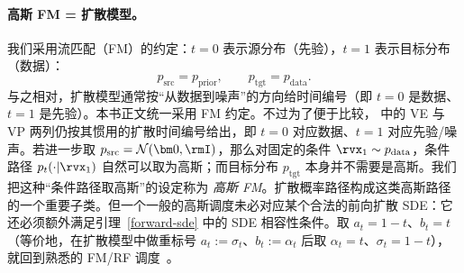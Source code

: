 \paragraph{高斯 FM = 扩散模型。}
我们采用流匹配（FM）的约定：$t=0$ 表示源分布（先验），$t=1$ 表示目标分布（数据）：
\[
p_{\mathrm{src}}=p_{\mathrm{prior}},\qquad p_{\mathrm{tgt}}=p_{\mathrm{data}}.
\]
与之相对，扩散模型通常按“从数据到噪声”的方向给时间编号（即 $t=0$ 是数据、$t=1$ 是先验）。本书正文统一采用 FM 约定。不过为了便于比较， 中的 VE 与 VP 两列仍按其惯用的扩散时间编号给出，即 $t=0$ 对应数据、$t=1$ 对应先验/噪声。若进一步取 $p_{\mathrm{src}}=\mathcal N(\bm 0,\rmI)$，那么对固定的条件 $\rvx_1\sim p_{\mathrm{data}}$，条件路径 $p_t(\cdot |\rvx_1)$ 自然可以取为高斯；而目标分布 $p_{\mathrm{tgt}}$ 本身并不需要是高斯。我们把这种“条件路径取高斯”的设定称为 \emph{高斯 FM}。扩散概率路径构成这类高斯路径的一个重要子类。但一个一般的高斯调度未必对应某个合法的前向扩散 SDE：它还必须额外满足引理~\ref{forward-sde} 中的 SDE 相容性条件。取 $a_t = 1-t$、$b_t = t$（等价地，在扩散模型中做重标号 $a_t:=\sigma_t$、$b_t:=\alpha_t$ 后取 $\alpha_t = t$、$\sigma_t = 1-t$），就回到熟悉的 FM/RF 调度~\citep{lipman2022flow,liu2022rectified}。


\begin{table}[th]
\caption{各类插值的汇总，均写为
$\rvx_t=a_t\rvx_0+b_t\rvx_1$，其中
$\rvx_0\sim p_{\mathrm{src}}=p_{\mathrm{prior}}$ 和
$\rvx_1\sim p_{\mathrm{tgt}}=p_{\mathrm{data}}$。FM/RF 列与三角插值列采用 FM 约定（$t=0$ 为源，$t=1$ 为目标），而 VE/VP 两列保留惯用的扩散时间约定（$t=0$ 为数据，$t=1$ 为先验/噪声），其中
$a_t:=\sigma_t$ 和 $b_t:=\alpha_t$。对于有限终端噪声水平下的 VE，精确的终端边缘为
$p_{\mathrm{data}}*\mathcal{N}(\bm{0},a_1^2\rmI)$；表中给出的高斯先验是“终端噪声远大于数据尺度”时的常用近似。}
  \small
  \centering
  \label{tb:interpolant_instances}
\end{table}


